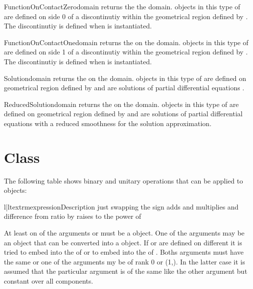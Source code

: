 \begin{funcdesc}{FunctionOnContactZero}{domain}
returns the \FunctionOnContactZero the \Domain domain. \Data objects in this type of \Function
are defined on side 0 of a discontinutiy  within the geometrical region defined by .
The discontinutiy is defined when  is instantiated.
\end{funcdesc}

\begin{funcdesc}{FunctionOnContactOne}{domain}
returns the \FunctionOnContactOne on the \Domain domain. 
\Data objects in this type of \Function
are defined on side 1 of a discontinutiy  within the geometrical region defined by .
The discontinutiy is defined when  is instantiated.
\end{funcdesc}

\begin{funcdesc}{Solution}{domain}
returns the \SolutionFS on the \Domain domain. \Data objects in this type of \Function
are defined on geometrical region defined by  and are solutions of
partial differential equations . 
\end{funcdesc}

\begin{funcdesc}{ReducedSolution}{domain}
returns the \ReducedSolutionFS on the \Domain domain. \Data objects in this type of \Function
are defined on geometrical region defined by  and are solutions of
partial differential equations  with a reduced smoothness 
for the solution approximation.
\end{funcdesc}

\section{\Data Class}


The following table shows binary and unitary operations that can be applied to
\Data objects:
\begin{tableii}{l|l}{textrm}{expression}{Description}
 {just  \index{+}}
 {swapping the sign\index{-}}
 {adds  and  \index{+}}
 {multiplies  and  \index{*}}
 {difference  from \index{-}}
 {ratio  by  \index{/}}
 {raises  to the power of  \index{**}}
\end{tableii}
At least on of the arguments  or  must be a
\Data object. One of the arguments may be an object that can be
converted into a \Data object. If  or  are
defined on different \FunctionSpace it is tried to embed 
into the \FunctionSpace of  or to embed  into
the \FunctionSpace of . Boths arguments must have the same
\Shape or one of the arguments my be of rank 0 or \Shape (1,). In the
latter case it is assumed that the particular argument is of the same
\Shape like the other argument but constant over all components.


